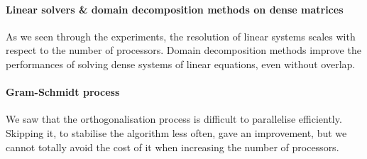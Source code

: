 \paragraph{Linear solvers \& domain decomposition methods on dense matrices}
As we seen through the experiments, the resolution of linear systems scales with respect to the number of processors.
Domain decomposition methods improve the performances of solving dense systems of linear equations, even without overlap.

\paragraph{Gram-Schmidt process}
We saw that the orthogonalisation process is difficult to parallelise efficiently.
Skipping it, to stabilise the algorithm less often, gave an improvement, but we cannot totally avoid the cost of it when increasing the number of processors.

